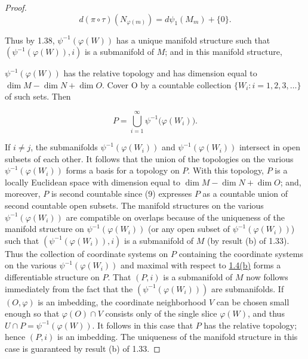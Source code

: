 \begin{proof}
	\[
		d(\pi\circ\tau)(N_{\varphi(m)})=d\psi_{1}(M_{m})+\{0\}.
	\]

	Thus by 1.38,  $ \psi^{-1}(\varphi(W)) $ has a unique manifold structure such that  $ (\psi^{-1}(\varphi(W)), i) $ is a submanifold of  $ M $; and in this manifold structure,

	$ \psi^{-1}\left(\varphi(W)\right) $ has the relative topology and has dimension equal to  $ \dim M - \dim N + \dim O $. Cover O by a countable collection  $ \{W_i: i = 1, 2, 3, \ldots\} $ of such sets. Then

	\begin{equation}
		\tag{9}\label{eq:1.39:9}
		P=\bigcup_{i=1}^{\infty}\psi^{-1}\bigl(\varphi(W_{i})\bigr).
	\end{equation}

	If $i \neq j$, the submanifolds $\psi^{-1}(\varphi(W_i))$ and $\psi^{-1}(\varphi(W_i))$ intersect in open subsets of each other. It follows that the union of the topologies on the various $\psi^{-1}(\varphi(W_i))$ forms a basis for a topology on $P$. With this topology, $P$ is a locally Euclidean space with dimension equal to $\dim M - \dim N + \dim O$; and, moreover, $P$ is second countable since (9) expresses $P$ as a countable union of second countable open subsets. The manifold structures on the various $\psi^{-1}(\varphi(W_i))$ are compatible on overlaps because of the uniqueness of the manifold structure on $\psi^{-1}(\varphi(W_i))$ (or any open subset of $\psi^{-1}(\varphi(W_i))$) such that $(\psi^{-1}(\varphi(W_i)),i)$ is a submanifold of $M$ (by result (b) of 1.33). Thus the collection of coordinate systems on $P$ containing the coordinate systems on the various $\psi^{-1}(\varphi(W_i))$ and maximal with respect to \hyperref[thm:1.4]{1.4(b)} forms a differentiable structure on $P$. That $(P,i)$ is a submanifold of $M$ now follows immediately from the fact that the $(\psi^{-1}(\varphi(W_i)))$ are submanifolds. If $(O, \varphi)$ is an imbedding, the coordinate neighborhood $V$ can be chosen small enough so that $\varphi(O) \cap V$ consists only of the single slice $\varphi(W)$, and thus $U \cap P = \psi^{-1}(\varphi(W))$. It follows in this case that $P$ has the relative topology; hence $(P,i)$ is an imbedding. The uniqueness of the manifold structure in this case is guaranteed by result (b) of 1.33.

\end{proof}

